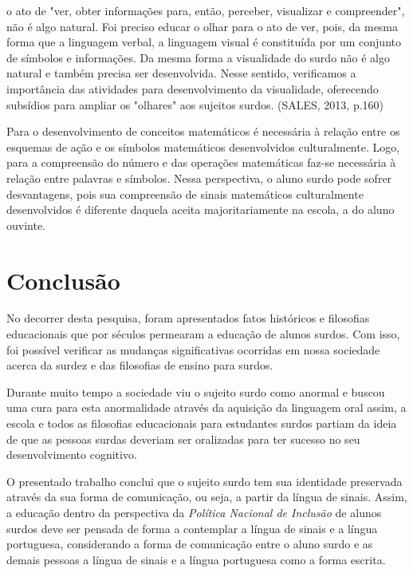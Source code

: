 \documentclass[brasil]{abnt}
\begin{document}
			\begin{citacao} [...] o ato de "ver, obter informações para, então, perceber, visualizar e compreender", não é algo natural. Foi preciso educar o olhar para o ato de ver, pois, da mesma forma que a linguagem verbal, 
							a linguagem visual é constituída por um conjunto de símbolos e informações. Da mesma forma a visualidade do surdo não é algo natural e também precisa ser desenvolvida. Nesse sentido, verificamos
							a importância das atividades para desenvolvimento da visualidade, oferecendo subsídios para ampliar os "olhares" aos sujeitos surdos. (SALES, 2013, p.160) 
			\end{citacao}
	
	Para o desenvolvimento de conceitos matemáticos é necessária à relação entre os esquemas de ação e os símbolos matemáticos desenvolvidos culturalmente. Logo, para a compreensão do número e das operações 
	matemáticas faz-se necessária à relação entre palavras e símbolos. Nessa perspectiva, o aluno surdo pode sofrer desvantagens, pois sua compreensão de sinais matemáticos culturalmente desenvolvidos é 
	diferente daquela aceita majoritariamente na escola, a do aluno ouvinte.

\chapter*{Conclusão}  

	No decorrer desta pesquisa, foram apresentados fatos históricos e filosofias educacionais que por séculos permearam a educação de alunos surdos. Com isso, foi possível verificar as mudanças
	significativas ocorridas em nossa sociedade acerca da surdez e das filosofias  de ensino para surdos. 
	
	Durante muito tempo a sociedade viu o sujeito surdo como anormal e buscou uma cura para esta anormalidade
	através da aquisição da linguagem oral assim, a escola e todos as filosofias educacionais para estudantes surdos partiam da ideia de que as pessoas surdas deveriam ser oralizadas para ter sucesso no seu 
	desenvolvimento cognitivo.  
	
	O presentado trabalho conclui que o sujeito surdo tem sua identidade preservada através da sua forma de comunicação, ou seja, a partir da língua de sinais. Assim, a educação dentro da perspectiva da \textit{Política Nacional de Inclusão} de alunos surdos deve ser pensada de forma a contemplar a língua de sinais e a língua portuguesa, considerando a forma de comunicação entre o aluno surdo e as demais pessoas a língua de sinais e a língua portuguesa como a forma escrita. 
	
\end{document}

